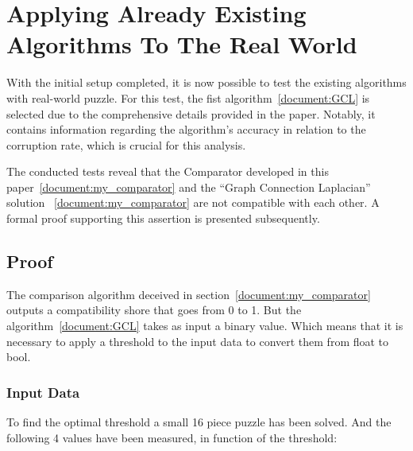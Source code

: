 \documentclass{article}
\begin{document}
\section{Applying Already Existing Algorithms To The Real World}
With the initial setup completed, it is now possible to
test the existing algorithms with real-world puzzle. For this test,
the fist algorithm~\cref{document:GCL} is selected due to the comprehensive
details provided in the paper. Notably, it contains information
regarding the algorithm's accuracy in relation to the corruption rate,
which is crucial for this analysis.

The conducted tests reveal that the Comparator developed in this paper~\cref{document:my_comparator}
and the ``Graph Connection Laplacian'' solution ~\cref{document:my_comparator} are not compatible with each other.
A formal proof supporting this assertion is presented subsequently.

\subsection{Proof}

The comparison algorithm deceived in section~\cref{document:my_comparator} outputs a compatibility
shore that goes from 0 to 1.\newline
But the algorithm~\cref{document:GCL} takes as input a binary value.
Which means that it is necessary to apply a threshold to the input
data to convert them from float to bool.
\subsubsection{Input Data}
To find the optimal threshold a small 16 piece puzzle has been solved.
And the following 4 values have been measured, in function of the threshold:
\end{document}
